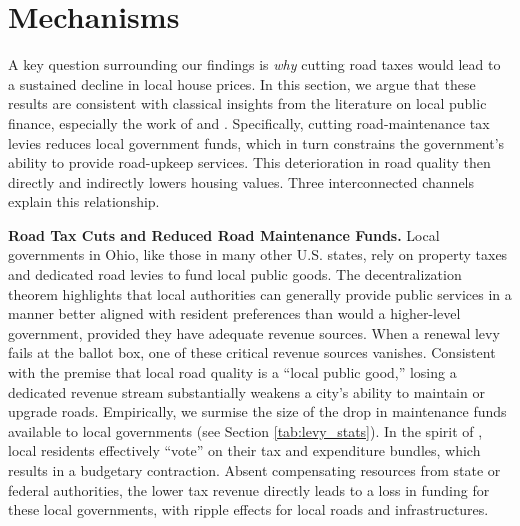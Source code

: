 \section{Mechanisms} \label{sec:mech}

A key question surrounding our findings is \textit{why} cutting road taxes would lead to a sustained decline in local house prices. In this section, we argue that these results are consistent with classical insights from the literature on local public finance, especially the work of \cite{Tiebout1956} and \cite{Oates1972}. Specifically, cutting road-maintenance tax levies reduces local government funds, which in turn constrains the government’s ability to provide road-upkeep services. This deterioration in road quality then directly and indirectly lowers housing values. Three interconnected channels explain this relationship.

{\bf Road Tax Cuts and Reduced Road Maintenance Funds.} Local governments in Ohio, like those in many other U.S. states, rely on property taxes and dedicated road levies to fund local public goods. The \cite{Oates1972} decentralization theorem highlights that local authorities can generally provide public services in a manner better aligned with resident preferences than would a higher-level government, provided they have adequate revenue sources. When a renewal levy fails at the ballot box, one of these critical revenue sources vanishes. Consistent with the premise that local road quality is a “local public good,” losing a dedicated revenue stream substantially weakens a city’s ability to maintain or upgrade roads. Empirically, we surmise the size of the drop in maintenance funds available to local governments (see Section \ref{tab:levy_stats}). In the spirit of \cite{Tiebout1956}, local residents effectively “vote” on their tax and expenditure bundles, which results in a budgetary contraction. Absent compensating resources from state or federal authorities, the lower tax revenue directly leads to a loss in funding for these local governments, with ripple effects for local roads and infrastructures.



